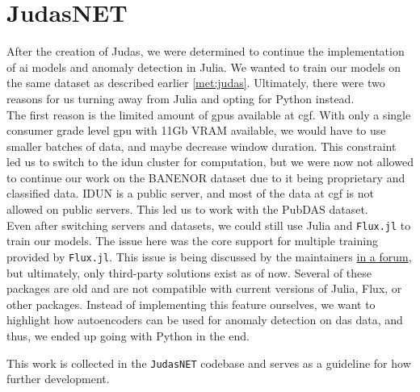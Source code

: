 \section{JudasNET}
\label{disc:judasnet}

After the creation of Judas, we were determined to continue the implementation of \acrshort{ai} models and anomaly detection in Julia. We wanted to train our models on the same dataset as described earlier \ref{met:judas}. Ultimately, there were two reasons for us turning away from Julia and opting for Python instead. \\

The first reason is the limited amount of \acrshort{gpu}s available at \acrshort{cgf}. With only a single consumer grade level \acrshort{gpu} with 11Gb VRAM available, we would have to use smaller batches of data, and maybe decrease window duration. This constraint led us to switch to the \gls{idun} cluster for computation, but we were now not allowed to continue our work on the BANENOR dataset due to it being proprietary and classified data. IDUN is a public server, and most of the data at \acrshort{cgf} is not allowed on public servers. This led us to work with the PubDAS dataset. \\

Even after switching servers and datasets, we could still use Julia and \texttt{Flux.jl} to train our models. The issue here was the core support for multiple training provided by \texttt{Flux.jl}. This issue is being discussed by the maintainers \href{https://github.com/FluxML/Flux.jl/issues/1829}{in a forum}, but ultimately, only third-party solutions exist as of now. Several of these packages are old and are not compatible with current versions of Julia, Flux, or other packages. Instead of implementing this feature ourselves, we want to highlight how autoencoders can be used for anomaly detection on \acrshort{das} data, and thus, we ended up going with Python in the end. 

This work is collected in the \texttt{JudasNET} codebase and serves as a guideline for how further development.
